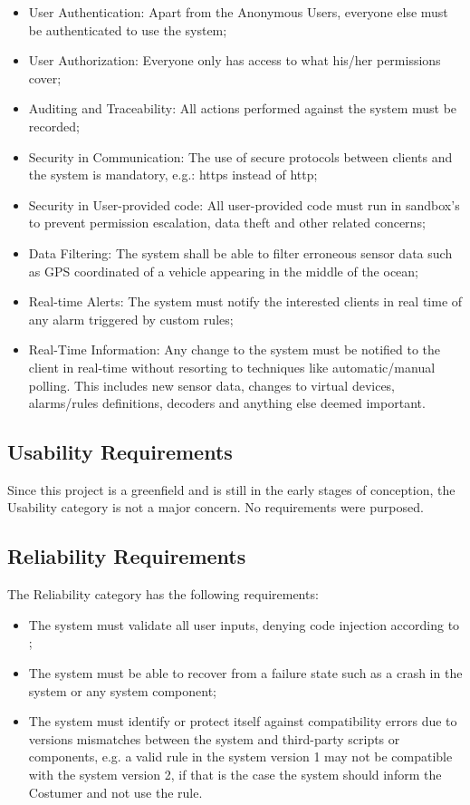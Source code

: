 \begin{itemize}
    \item User Authentication: Apart from the Anonymous Users, everyone else must be authenticated to use the system;
    \item User Authorization: Everyone only has access to what his/her permissions cover;
    \item Auditing and Traceability: All actions performed against the system must be recorded;
    \item Security in Communication: The use of secure protocols between clients and the system is mandatory, e.g.: https instead of http;
    \item Security in User-provided code: All user-provided code must run in sandbox's to prevent permission escalation, data theft and other related concerns;
    \item Data Filtering: The system shall be able to filter erroneous sensor data such as GPS coordinated of a vehicle appearing in the middle of the ocean;
    \item Real-time Alerts: The system must notify the interested clients in real time of any alarm triggered by custom rules;
    \item Real-Time Information: Any change to the system must be notified to the client in real-time without resorting to techniques like automatic/manual polling. This includes new sensor data, changes to virtual devices, alarms/rules definitions, decoders and anything else deemed important.
\end{itemize}

\subsection{Usability Requirements}
\label{subsec:requirements:non_functional:usability}

Since this project is a greenfield and is still in the early stages of conception, the Usability category is not a major concern. No requirements were purposed.

\subsection{Reliability Requirements}
\label{subsec:requirements:non_functional:reliability}

The Reliability category has the following requirements:

\begin{itemize}
    \item The system must validate all user inputs, denying code injection according to \cite{top10};
    \item The system must be able to recover from a failure state such as a crash in the system or any system component;
    \item The system must identify or protect itself against compatibility errors due to versions mismatches between the system and third-party scripts or components, e.g. a valid rule in the system version 1 may not be compatible with the system version 2, if that is the case the system should inform the Costumer and not use the rule.
\end{itemize}

